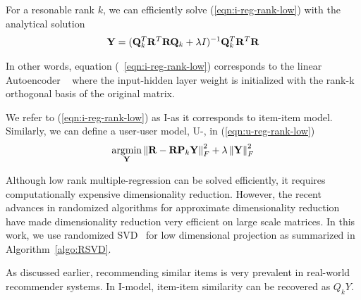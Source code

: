 For a resonable rank $k$, we can efficiently solve (\ref{eqn:i-reg-rank-low}) with the analytical solution 
\begin{align*}
\mathbf{Y} = (\mathbf{Q}_k^T \mathbf{R}^T\mathbf{R}\mathbf{Q}_k +\lambda I)^{-1} \mathbf{Q}_k^T \mathbf{R}^T \mathbf{R}
\end{align*}

In other words, equation (~\ref{eqn:i-reg-rank-low}) corresponds to the linear Autoencoder ~\cite{Sedhain:2015} where the input-hidden layer weight is initialized with the rank-k orthogonal basis of the original matrix. 

We refer to (\ref{eqn:i-reg-rank-low}) as I-\LinearLow as it corresponds to item-item model. Similarly, we can define a user-user model, U-\LinearLow, in (\ref{eqn:u-reg-rank-low})
\begin{align}
\label{eqn:u-reg-rank-low}
\underset{\mathbf{Y}}{\mathrm{argmin}}  \left \| \mathbf{R} - \mathbf{R}\mathbf{P}_k\mathbf{Y}\right \|_F^2 + \lambda \left \|  \mathbf{Y} \right \|_F^2 
\end{align}

Although low rank multiple-regression can be solved efficiently, it requires computationally expensive dimensionality reduction. However, the recent advances in randomized algorithms for approximate dimensionality reduction~\citep{halko2011} have made dimensionality reduction very efficient on large scale matrices. In this work, we use randomized SVD~\citep{halko2011} for low dimensional projection as summarized in Algorithm~\ref{algo:RSVD}.

As discussed earlier, recommending similar items is very prevalent in real-world recommender systems.
In I-\LinearLow model, item-item similarity can be recovered as $Q_kY$. 

\begin{equation*}
\end{equation*}


